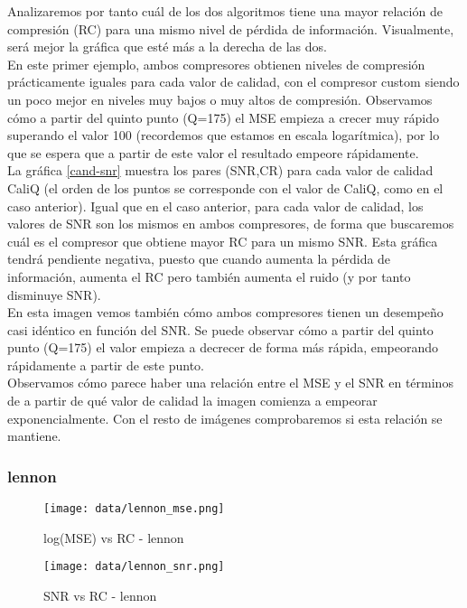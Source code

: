 \documentclass[12pt,a4paper]{article}
\begin{document}
Analizaremos por tanto cuál de los dos algoritmos tiene una mayor relación de compresión (RC) para una mismo nivel de pérdida de información. Visualmente, será mejor la gráfica que esté más a la derecha de las dos.\\

En este primer ejemplo, ambos compresores obtienen niveles de compresión prácticamente iguales para cada valor de calidad, con el compresor custom siendo un poco mejor en niveles muy bajos o muy altos de compresión. Observamos cómo a partir del quinto punto (Q=175) el MSE empieza a crecer muy rápido superando el valor 100 (recordemos que estamos en escala logarítmica), por lo que se espera que a partir de este valor el resultado empeore rápidamente.\\

La gráfica \ref{cand-snr} muestra los pares (SNR,CR) para cada valor de calidad CaliQ (el orden de los puntos se corresponde con el valor de CaliQ, como en el caso anterior). Igual que en el caso anterior, para cada valor de calidad, los valores de SNR son los mismos en ambos compresores, de forma que buscaremos cuál es el compresor que obtiene mayor RC para un mismo SNR. Esta gráfica tendrá pendiente negativa, puesto que cuando aumenta la pérdida de información, aumenta el RC pero también aumenta el ruido (y por tanto disminuye SNR).\\

En esta imagen vemos también cómo ambos compresores tienen un desempeño casi idéntico en función del SNR. Se puede observar cómo a partir del quinto punto (Q=175) el valor empieza a decrecer de forma más rápida, empeorando rápidamente a partir de este punto.\\

Observamos cómo parece haber una relación entre el MSE y el SNR en términos de a partir de qué valor de calidad la imagen comienza a empeorar exponencialmente. Con el resto de imágenes comprobaremos si esta relación se mantiene.\\

\subsubsection{lennon}
\hspace*{-2.5em}
\begin{minipage}{0.5\textwidth}
        \centering
        \begin{figure}[H]
    \centering
    \texttt{[image: data/lennon\_mse.png]}
    \caption{log(MSE) vs RC - lennon}
    \label{len-mse}
    \end{figure}
    \end{minipage}\hfill
    \begin{minipage}{0.5\textwidth}
        \begin{figure}[H]
    \centering
    \texttt{[image: data/lennon\_snr.png]}
    \caption{SNR vs RC - lennon}
    \label{len-snr}
\end{figure}
\end{minipage}
\vspace{2em}
\end{document}
